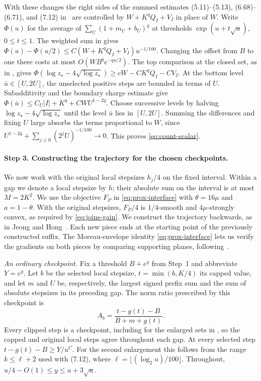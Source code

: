 \documentclass[11pt]{article}
\theoremstyle{definition}
\begin{document}
With these changes the right sides of the summed estimates
(5.11)--(5.13), (6.68)--(6.71), and (7.12) in~\cite{JH}
are controlled by \(W+K^qQ_I+V_I\) in place of \(W\).
Write \(\Phi(u)\) for the average of \(\sum_U(1+m_U+b_U)^q\)
at thresholds \(\exp(u+t\sqrt u)\), \(0\le t\le1\).
The weighted sum in \cite[Proposition~7.3]{JH} gives
\(\Phi(u)-\Phi(u/2)\le C(W+K^qQ_I+V_I)u^{-1/100}\). Changing the offset from
\(B\) to one there costs at most \(O(WB^q e^{-qu/2})\).
The top comparison at the closed set, as in \cite[Lemma~5.2]{JH},
gives \(\Phi(\log z_\star-4\sqrt{\log z_\star})\ge cW-C K^q Q_I-CV_I\).
At the bottom level \(\bar u\in[U,2U]\), the unselected positive
steps are bounded in terms of \(U\). Subadditivity and the boundary
charge estimate give
\(\Phi(\bar u)\le C_U|I|+K^q+CW U^{1-2q}\).
Choose successive levels by halving \(\log z_\star-4\sqrt{\log z_\star}\)
until the level \(\bar u\) lies in \([U,2U]\).
Summing the differences and fixing \(U\) large absorbs the terms
proportional to \(W\), since
\(U^{1-2q}+\sum_{j\ge0}(2^j U)^{-1/100}\to0\).
This proves \eqref{eq:count-scalar}.

\paragraph{Step 3. Constructing the trajectory for the chosen checkpoints.}
We now work with the original local stepsizes \(h_j/4\) on the fixed
interval. Within a gap we denote a local stepsize by \(h\);
their absolute sum on the interval is at most \(M=2K^2\). We use the objective \(F_P\) in \eqref{eq:prox-interface} with
\(\theta=16\mu\) and \(a=1-\theta\). With the original stepsizes,
\(F_P/4\) is \(1/4\)-smooth and \(4\mu\)-strongly convex, as
required by \eqref{eq:joins-gain}. We construct the trajectory backwards,
as in Jeong and Hong~\cite[Lemma~4.3 and Section~6.5.3]{JH}.
Each new piece ends at the starting point of the previously constructed
suffix. The Moreau-envelope identity \eqref{eq:prox-interface} lets
us verify the gradients on both pieces by comparing supporting planes,
following~\cite[Section~4.1]{JH}.

\noindent\emph{An ordinary checkpoint.}
Fix a threshold \(B+e^y\) from Step~1 and abbreviate \(Y=e^y\). Let $b$ be the selected local stepsize, $t=\min(b,K/4)$ its capped value, and let \(m\) and \(U\) be, respectively, the largest signed prefix sum
and the sum of absolute stepsizes in its preceding gap. The norm ratio prescribed by this checkpoint is
\[
 A_b=\frac{t-g(t)-B}{B+m+g(t)}.
\]
Every clipped step is a checkpoint, including for the enlarged sets in \cite[(5.24), (7.12)]{JH}, so the capped and original local steps agree throughout each gap. At every selected step $t-g(t)-B\ge Y/u^C$. For the second enlargement this follows from the range $k\le\ell+2$ used with (7.12), where $\ell=\lfloor(\log_2u)/100\rfloor$. Throughout, $u/4-O(1)\le y\le u+3\sqrt u$.
\end{document}
